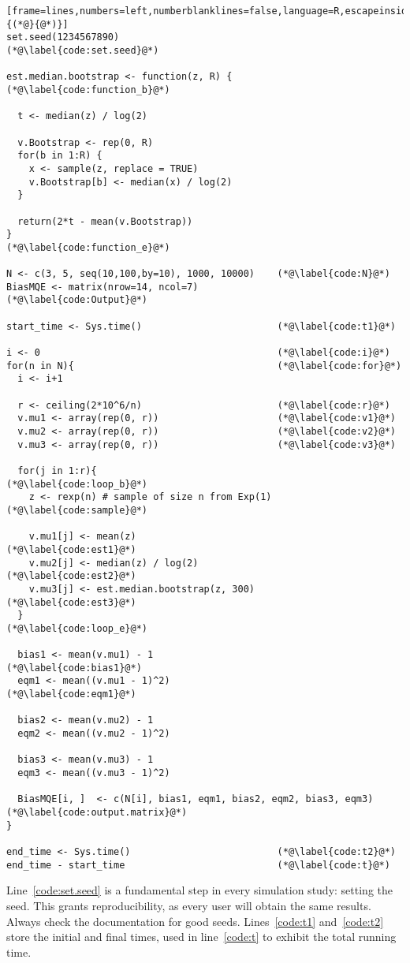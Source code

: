 \begin{lstlisting}[frame=lines,numbers=left,numberblanklines=false,language=R,escapeinside={(*@}{@*)}]
set.seed(1234567890)							(*@\label{code:set.seed}@*)

est.median.bootstrap <- function(z, R) {		(*@\label{code:function_b}@*)
  
  t <- median(z) / log(2)
  
  v.Bootstrap <- rep(0, R)
  for(b in 1:R) {
    x <- sample(z, replace = TRUE)
    v.Bootstrap[b] <- median(x) / log(2)
  }
  
  return(2*t - mean(v.Bootstrap))
}												(*@\label{code:function_e}@*)

N <- c(3, 5, seq(10,100,by=10), 1000, 10000)	(*@\label{code:N}@*)
BiasMQE <- matrix(nrow=14, ncol=7)				(*@\label{code:Output}@*)

start_time <- Sys.time()						(*@\label{code:t1}@*)

i <- 0											(*@\label{code:i}@*)
for(n in N){									(*@\label{code:for}@*)
  i <- i+1
  
  r <- ceiling(2*10^6/n)						(*@\label{code:r}@*)
  v.mu1 <- array(rep(0, r))						(*@\label{code:v1}@*)
  v.mu2 <- array(rep(0, r))						(*@\label{code:v2}@*)
  v.mu3 <- array(rep(0, r))						(*@\label{code:v3}@*)
  
  for(j in 1:r){								(*@\label{code:loop_b}@*)
    z <- rexp(n) # sample of size n from Exp(1)	(*@\label{code:sample}@*)
    
    v.mu1[j] <- mean(z)							(*@\label{code:est1}@*)
    v.mu2[j] <- median(z) / log(2)				(*@\label{code:est2}@*)
    v.mu3[j] <- est.median.bootstrap(z, 300)	(*@\label{code:est3}@*)
  }												(*@\label{code:loop_e}@*)
  
  bias1 <- mean(v.mu1) - 1						(*@\label{code:bias1}@*)
  eqm1 <- mean((v.mu1 - 1)^2)					(*@\label{code:eqm1}@*)
  
  bias2 <- mean(v.mu2) - 1
  eqm2 <- mean((v.mu2 - 1)^2)
  
  bias3 <- mean(v.mu3) - 1
  eqm3 <- mean((v.mu3 - 1)^2)
  
  BiasMQE[i, ]  <- c(N[i], bias1, eqm1, bias2, eqm2, bias3, eqm3)	(*@\label{code:output.matrix}@*)
}

end_time <- Sys.time()							(*@\label{code:t2}@*)
end_time - start_time							(*@\label{code:t}@*)
\end{lstlisting}

Line~\ref{code:set.seed} is a fundamental step in every simulation study: setting the seed.
This grants reproducibility, as every user will obtain the same results.
Always check the documentation for good seeds.
Lines~\ref{code:t1} and~\ref{code:t2} store the initial and final times, used in line~\ref{code:t} to exhibit the total running time.


